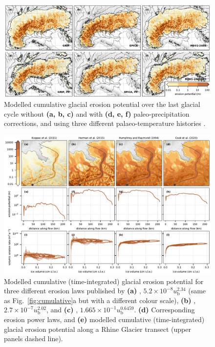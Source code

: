 \documentclass[utf8]{article}
\begin{document}
    \begin{figure}
      \centerline{\includegraphics{alpero_sensitivity}}
      \caption{%
        Modelled cumulative glacial erosion potential over the last glacial
        cycle without \textbf{(a, b, c)} and with \textbf{(d, e, f)}
        paleo-precipitation corrections, and using three different
        palaeo-temperature histories \citep[see][]{Seguinot.etal.2018}.}
      \label{fig:sensitivity}
    \end{figure}

    \begin{figure}
      \centerline{\includegraphics{alpero_powerlaws}}
      \caption{%
        Modelled cumulative (time-integrated) glacial erosion potential for
        three different erosion laws published by
        \textbf{(a)} \citet{Koppes.etal.2015},
          $5.2 \times 10^{-8} u_\mathrm{b} ^{2.34}$ (same as
          Fig.~\ref{fig:cumulative}a but with a different colour scale),
        \textbf{(b)} \citet{Herman.etal.2015},
          $2.7 \times 10^{-7} u_\mathrm{b} ^{2.02}$, and
        \textbf{(c)} \citet{Cook.etal.2020},
          $1.665 \times 10^{-1} u_\mathrm{b} ^{0.6459}$.
        \textbf{(d)} Corresponding erosion power laws, and
        \textbf{(e)} modelled cumulative (time-integrated) glacial erosion
          potential along a Rhine Glacier transect (upper panels dashed line).}
      \label{fig:powerlaws}
    \end{figure}



\end{document}
